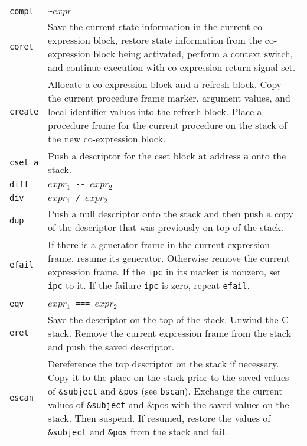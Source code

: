 \begin{xtabular}{l@{\hspace{1.5cm}}p{13.5cm}}
\texttt{compl} & \texttt{\textasciitilde $expr$}\\

\texttt{coret} & Save the current state information in the current
co-expression block, restore state information from the co-expression
block being activated, perform a context switch, and continue
execution with co-expression return signal set.\\

\texttt{create} & Allocate a co-expression block and a refresh block. Copy the
current procedure frame marker, argument values, and local identifier
values into the refresh block. Place a procedure frame for the current
procedure on the stack of the new co-expression block.\\

\texttt{cset a} & Push a descriptor for the cset block at address \texttt{a}
onto the stack.\\

\texttt{diff}  & \texttt{$expr_1$ -{}- $expr_2$}\\

\texttt{div}   & \texttt{$expr_1$ / $expr_2$}\\

\texttt{dup}   & Push a null descriptor onto the stack and then push a copy of
the descriptor that was previously on top of the stack.\\

\texttt{efail} & If there is a generator frame in the current expression
frame, resume its generator. Otherwise remove the current expression
frame. If the \texttt{ipc} in its marker is nonzero, set \texttt{ipc} to it. If the
failure \texttt{ipc} is zero, repeat \texttt{efail}.\\

\\

\texttt{eqv}   & \texttt{$expr_1$ === $expr_2$}\\

\texttt{eret}  & Save the descriptor on the top of the stack. Unwind the C
stack. Remove the current expression frame from the stack and push the
saved descriptor.\\

\texttt{escan} & Dereference the top descriptor on the stack if necessary. Copy
it to the place on the stack prior to the saved values of \texttt{\&subject} and
\texttt{\&pos} (see \texttt{bscan}). Exchange the current values of
\texttt{\texttt{\&subject}} and \&pos with the saved values on the stack. Then
suspend. If resumed, restore the values of \texttt{\&subject} and \texttt{\&pos}
from the stack and fail.\\


\end{xtabular}
